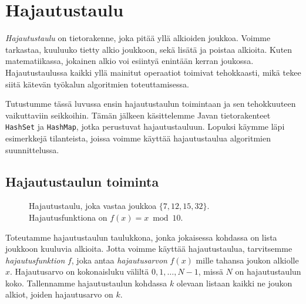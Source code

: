 \chapter{Hajautustaulu}


\emph{Hajautustaulu} on tietorakenne,
joka pitää yllä alkioiden joukkoa.
Voimme tarkastaa,
kuuluuko tietty alkio joukkoon,
sekä lisätä ja poistaa alkioita.
Kuten matematiikassa, jokainen alkio
voi esiintyä enintään kerran joukossa.
Hajautustaulussa kaikki yllä mainitut
operaatiot toimivat tehokkaasti, mikä tekee siitä
kätevän työkalun algoritmien toteuttamisessa.

Tutustumme tässä luvussa ensin hajautustaulun
toimintaan ja sen tehokkuuteen
vaikuttaviin seikkoihin.
Tämän jälkeen käsittelemme Javan tietorakenteet
\texttt{HashSet} ja \texttt{HashMap},
jotka perustuvat hajautustauluun.
Lopuksi käymme läpi esimerkkejä tilanteista,
joissa voimme käyttää hajautustaulua
algoritmien suunnittelussa.

\section{Hajautustaulun toiminta}

\begin{figure}
\center
{}
\caption{Hajautustaulu, joka vastaa joukkoa $\{7,12,15,32\}$.
Hajautusfunktiona on $f(x)=x \bmod 10$.}
\label{fig:hajtau}
\end{figure}


Toteutamme hajautustaulun taulukkona,
jonka jokaisessa kohdassa on lista joukkoon kuuluvia alkioita.
Jotta voimme käyttää hajautustaulua,
tarvitsemme \emph{hajautusfunktion} $f$,
joka antaa \emph{hajautusarvon}
$f(x)$ mille tahansa joukon alkiolle $x$.
Hajautusarvo on kokonaisluku väliltä
$0,1,\dots,N-1$, missä $N$ on hajautustaulun koko.
Tallennamme hajautustaulun kohdassa $k$ olevaan listaan
kaikki ne joukon alkiot, joiden hajautusarvo on $k$.

